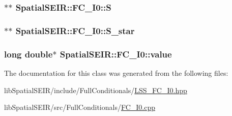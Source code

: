 \hypertarget{classSpatialSEIR_1_1FC__I0_a32d56d02b4f1cc6a1394104cc45d6d5d}{
\subsubsection[{S}]{$\ast$$\ast$ Spatial\-S\-E\-I\-R\-::\-F\-C\-\_\-\-I0\-::\-S}}\label{classSpatialSEIR_1_1FC__I0_a32d56d02b4f1cc6a1394104cc45d6d5d}
\hypertarget{classSpatialSEIR_1_1FC__I0_ad631c68300d51c2866204a5486706c0b}{
\subsubsection[{S\-\_\-star}]{$\ast$$\ast$ Spatial\-S\-E\-I\-R\-::\-F\-C\-\_\-\-I0\-::\-S\-\_\-star}}\label{classSpatialSEIR_1_1FC__I0_ad631c68300d51c2866204a5486706c0b}
\hypertarget{classSpatialSEIR_1_1FC__I0_a81955b1dfdaf09a58122944420b40750}{
\subsubsection[{value}]{\setlength{\rightskip}{0pt plus 5cm}long double$\ast$ Spatial\-S\-E\-I\-R\-::\-F\-C\-\_\-\-I0\-::value}}\label{classSpatialSEIR_1_1FC__I0_a81955b1dfdaf09a58122944420b40750}


The documentation for this class was generated from the following files\-:\begin{DoxyCompactItemize}
\item 
lib\-Spatial\-S\-E\-I\-R/include/\-Full\-Conditionals/\hyperlink{LSS__FC__I0_8hpp}{L\-S\-S\-\_\-\-F\-C\-\_\-\-I0.\-hpp}\item 
lib\-Spatial\-S\-E\-I\-R/src/\-Full\-Conditionals/\hyperlink{FC__I0_8cpp}{F\-C\-\_\-\-I0.\-cpp}\end{DoxyCompactItemize}
